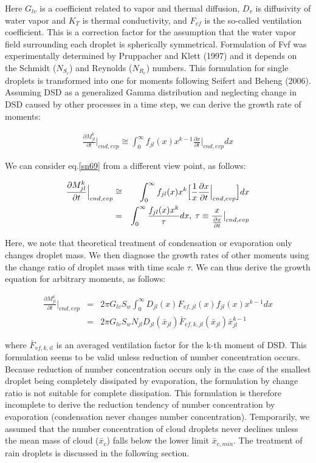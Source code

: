 Here $G_{lv}$ is a coefficient related to vapor and thermal diffusion, $D_{v}$ is diffusivity of water vapor and $K_{T}$ is thermal conductivity, and $F_{vf}$ is the so-called ventilation coefficient. This is a correction factor for the assumption that the water vapor field surrounding each droplet is spherically symmetrical. Formulation of Fvf was experimentally determined by Pruppacher and Klett (1997) and it depends on the Schmidt ($N_{S_{c}}$) and Reynolds ($N_{R_{e}}$) numbers. This formulation for single droplets is transformed into one for moments following Seifert and Beheng (2006). Assuming DSD as a generalized Gamma distribution and neglecting change in DSD caused by other processes in a time step, we can derive the growth rate of moments:

\begin{eqnarray}
\frac{\partial M_{jl}^{k}}{\partial t}\Bigr|_{cnd,evp}\cong \int_{0}^{\infty}f_{jl}(x)x^{k-1}\frac{\partial x}{\partial t}\Bigr|_{cnd,evp}dx\label{sn69}
\end{eqnarray}

We can consider eq.\ref{sn69} from a different view point, as follows:

\begin{eqnarray}
\frac{\partial M_{jl}^{k}}{\partial t}\Bigr|_{cnd,evp}&\cong& \int_{0}^{\infty}f_{jl}(x)x^{k}\Bigl[\frac{1}{x}\frac{\partial x}{\partial t}\Bigr|_{cnd,evp}\Bigr]dx\nonumber\\
&=&\int_{0}^{\infty}\frac{f_{jl}(x)x^{k}}{\tau}dx,\;\tau\equiv\frac{x}{\frac{\partial x}{\partial t}}\bigr|_{cnd,evp}\label{sn70}
\end{eqnarray}

Here, we note that theoretical treatment of condensation or evaporation only changes droplet mass. We then diagnose the growth rates of other moments using the change ratio of droplet mass with time scale $\tau$. We can thus derive the growth equation for arbitrary moments, as follows:

\begin{eqnarray}
\frac{\partial M_{jl}^{k}}{\partial t}\Bigr|_{cnd,evp}&=&2\pi G_{lv}S_{w}\int_{0}^{\infty}D_{jl}(x)F_{vf,jl}(x)f_{jl}(x)x^{k-1}dx\nonumber\\
&=&2\pi G_{lv}S_{w}N_{jl}D_{jl}(\bar{x}_{jl})\bar{F}_{vf,k,jl}(\bar{x}_{jl})\bar{x}_{jl}^{k-1}\label{sn71}
\end{eqnarray}

where $\bar{F}_{vf,k,il}$ is an averaged ventilation factor for the k-th moment of DSD. This formulation seems to be valid unless reduction of number concentration occurs. Because reduction of number concentration occurs only in the case of the smallest droplet being completely dissipated by evaporation, the formulation by change ratio is not suitable for complete dissipation. This formulation is therefore incomplete to derive the reduction tendency of number concentration by evaporation (condensation never changes number concentration). Temporarily, we assumed that the number concentration of cloud droplets never declines unless the mean mass of cloud ($\bar{x}_{c}$) falls below the lower limit $\bar{x}_{c,min}$. The treatment of rain droplets is discussed in the following section.


